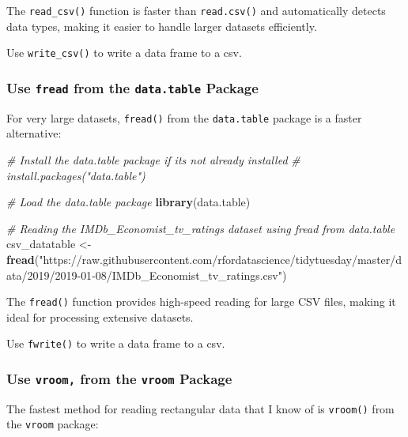 \documentclass[
]{book}
\newenvironment{Shaded}{\begin{snugshade}}{\end{snugshade}}
\newcommand{\CommentTok}[1]{\textcolor[rgb]{0.56,0.35,0.01}{\textit{#1}}}
\newcommand{\FunctionTok}[1]{\textcolor[rgb]{0.13,0.29,0.53}{\textbf{#1}}}
\newcommand{\NormalTok}[1]{#1}
\newcommand{\OtherTok}[1]{\textcolor[rgb]{0.56,0.35,0.01}{#1}}
\newcommand{\StringTok}[1]{\textcolor[rgb]{0.31,0.60,0.02}{#1}}
\begin{document}
The \texttt{read\_csv()} function is faster than \texttt{read.csv()} and automatically detects data types, making it easier to handle larger datasets efficiently.

Use \texttt{write\_csv()} to write a data frame to a csv.

\subsubsection*{\texorpdfstring{Use \texttt{fread} from the \texttt{data.table} Package}{Use fread from the data.table Package}}\label{use-fread-from-the-data.table-package}

For very large datasets, \texttt{fread()} from the \texttt{data.table} package is a faster alternative:

\begin{Shaded}
\begin{Highlighting}[]
\CommentTok{\# Install the data.table package if it\textquotesingle{}s not already installed}
\CommentTok{\# install.packages("data.table")}

\CommentTok{\# Load the data.table package}
\FunctionTok{library}\NormalTok{(data.table)}

\CommentTok{\# Reading the IMDb\_Economist\_tv\_ratings dataset using fread from data.table}
\NormalTok{csv\_datatable }\OtherTok{\textless{}{-}} \FunctionTok{fread}\NormalTok{(}\StringTok{"https://raw.githubusercontent.com/rfordatascience/tidytuesday/master/data/2019/2019{-}01{-}08/IMDb\_Economist\_tv\_ratings.csv"}\NormalTok{)}
\end{Highlighting}
\end{Shaded}

The \texttt{fread()} function provides high-speed reading for large CSV files, making it ideal for processing extensive datasets.

Use \texttt{fwrite()} to write a data frame to a csv.

\subsubsection*{\texorpdfstring{Use \texttt{vroom,} from the \texttt{vroom} Package}{Use vroom, from the vroom Package}}\label{use-vroom-from-the-vroom-package}

The fastest method for reading rectangular data that I know of is \texttt{vroom()} from the \texttt{vroom} package:
\end{document}
